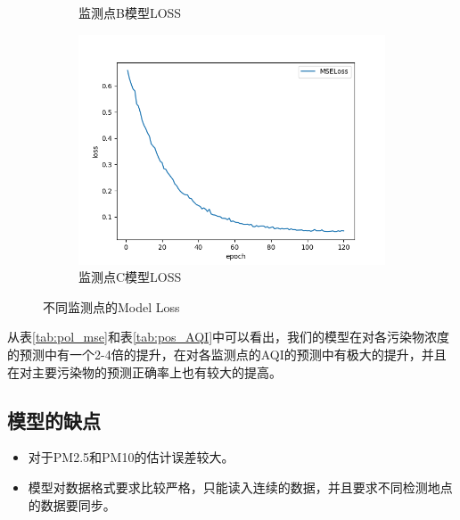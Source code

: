 \documentclass[bwprint]{gmcmthesis}
\numberwithin{figure}{section}
\begin{document}
\begin{figure}
\begin{subfigure}[ht]{.3\textwidth}
		\caption{监测点B模型LOSS}
		\label{B_model_loss}
	\end{subfigure}
	\begin{subfigure}[ht]{.3\textwidth}
		\centering
		\includegraphics[width=\textwidth]{figures/Model_loss_C.png}
		\caption{监测点C模型LOSS}
		\label{C_model_loss}
	\end{subfigure}
	\caption{不同监测点的Model Loss}
	\label{model_loss}
\end{figure}

\begin{table}
	\begin{center}
	\end{center}
	\caption{各监测点AQI的MSE及主要污染物的预测正确率。}\label{tab:pos_AQI}
\end{table}
从表\ref{tab:pol_mse}和表\ref{tab:pos_AQI}中可以看出，我们的模型在对各污染物浓度的预测中有一个2-4倍的提升，在对各监测点的AQI的预测中有极大的提升，并且在对主要污染物的预测正确率上也有较大的提高。
\subsection{模型的缺点}
\begin{itemize}
	\item 对于PM2.5和PM10的估计误差较大。
	\item 模型对数据格式要求比较严格，只能读入连续的数据，并且要求不同检测地点的数据要同步。
\end{itemize}
\end{document}
